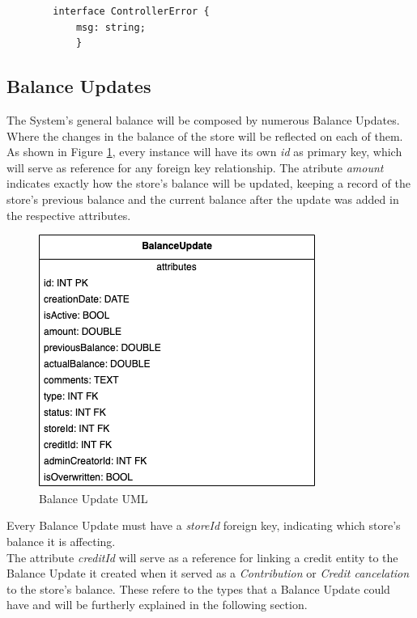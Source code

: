     \begin{verbatim}
        interface ControllerError {
            msg: string;
            }
    \end{verbatim}
                

    \subsection{Balance Updates}

The System's general balance will be composed by numerous Balance Updates. Where the changes in the balance of the store will be reflected on each of them. As shown in Figure \ref{fig:uml_balance_update}, every instance will have its own \textit{id} as primary key, which will serve as reference for any foreign key relationship. The atribute \textit{amount} indicates exactly how the store's balance will be updated, keeping a record of the store's previous balance and the current balance after the update was added in the respective attributes.

\begin{figure} [H]
    \centering
    \includegraphics[scale = 0.7]{assets/uml/BalanceUpdate.png}
    \caption{Balance Update UML}\label{fig:uml_balance_update}
\end{figure}

Every Balance Update must have a \textit{storeId} foreign key, indicating which store's balance it is affecting.\\ 

The attribute \textit{creditId} will serve as a reference for linking a credit entity to the Balance Update it created when it served as a \textit{Contribution} or \textit{Credit cancelation} to the store's balance. These refere to the types that a Balance Update could have and will be furtherly explained in the following section.\\

